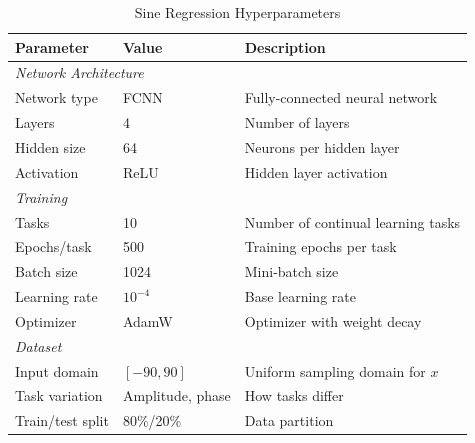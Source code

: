 {\small
\begin{table}[h]
\centering
\caption{Sine Regression Hyperparameters}
\label{tab:sine_hyperparams}
\begin{tabular}{lll}
\hline
\textbf{Parameter} & \textbf{Value} & \textbf{Description} \\
\hline
\multicolumn{3}{l}{\textit{Network Architecture}} \\
Network type & FCNN & Fully-connected neural network \\
Layers & 4 & Number of layers \\
Hidden size & 64 & Neurons per hidden layer \\
Activation & ReLU & Hidden layer activation \\
\hline
\multicolumn{3}{l}{\textit{Training}} \\
Tasks & 10 & Number of continual learning tasks \\
Epochs/task & 500 & Training epochs per task \\
Batch size & 1024 & Mini-batch size \\
Learning rate & $10^{-4}$ & Base learning rate \\
Optimizer & AdamW & Optimizer with weight decay \\
\hline
\multicolumn{3}{l}{\textit{Dataset}} \\
Input domain & $[-90, 90]$ & Uniform sampling domain for $x$ \\
Task variation & Amplitude, phase & How tasks differ \\
Train/test split & 80\%/20\% & Data partition \\
\hline
\end{tabular}
\end{table}
}

